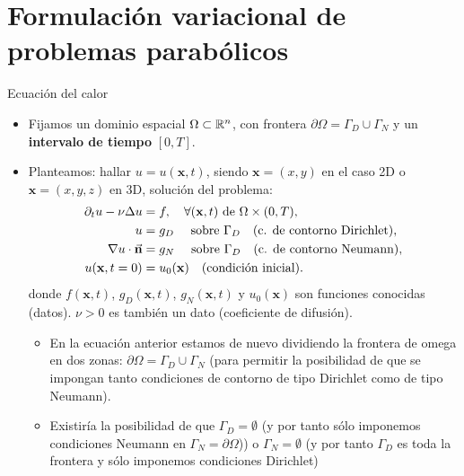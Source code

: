 \documentclass[9pt, dvipsnames,]{beamer}
\begin{document}
\section{Formulación variacional de problemas parabólicos}

\begin{frame}{Ecuación del calor}
  \begin{itemize}

  \item
  Fijamos un dominio espacial $\Omega\subset{\mathbb R}^n$,
  con frontera $\partial\Omega=\Gamma_D\cup\Gamma_N$ y un \textbf{intervalo de
    tiempo} $[0,T]$.


\item
  Planteamos: hallar $u=u(\mathbf{x}, t)$, siendo $\mathbf{x}=(x,y)$ en el caso 2D
  o $\mathbf{x}=(x,y,z)$ en 3D, solución del problema:
   \begin{align*}
   \partial_t u - \nu\Delta u &= f, \quad \forall(\mathbf{x},t)\text{ de }\Omega\times (0,T), \\
   u &= g_D \quad\text{ sobre } \Gamma_D \quad \text{(c. de contorno Dirichlet)},\\
   \nabla u\cdot\vec{\mathbf{n}} &= g_N \quad\text{ sobre } \Gamma_D \quad \text{(c. de contorno Neumann)},\\
   u(\mathbf{x},t=0) &= u_0(\mathbf{x}) \quad \text{(condición inicial)}.
 \end{align*}
 donde $f(\mathbf{x},t)$, $g_D(\mathbf{x},t)$, $g_N(\mathbf{x},t)$ y
 $u_0(\mathbf{x})$ son funciones conocidas (datos). $\nu>0$ es también un dato (coeficiente de difusión).

 \vfill
 \begin{small}
 \begin{itemize}
 \item
   En la ecuación anterior estamos de nuevo dividiendo la frontera de
   omega en dos zonas: $\partial\Omega=\Gamma_D\cup\Gamma_N$ (para
   permitir la posibilidad de que se impongan tanto condiciones de
   contorno de tipo Dirichlet como de tipo Neumann).
 \item Existiría la posibilidad de que $\Gamma_D=\emptyset$ (y por
   tanto sólo imponemos condiciones Neumann en
   $\Gamma_N=\partial\Omega$)) o $\Gamma_N=\emptyset$ (y por tanto
   $\Gamma_D$ es toda la frontera y sólo imponemos condiciones
   Dirichlet)
 \end{itemize}
\end{small}
\end{itemize}
\end{frame}
\end{document}
